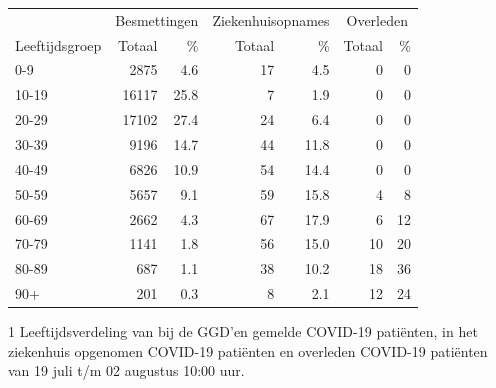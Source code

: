 \documentclass[
  english,
  man,floatsintext]{apa6}
\begin{document}
\begin{table}
\centering\begingroup\fontsize{11}{13}\selectfont

\begin{threeparttable}
\begin{tabular}{lrrrrrr}
\toprule
\multicolumn{1}{c}{ } & \multicolumn{2}{c}{Besmettingen} & \multicolumn{2}{c}{Ziekenhuisopnames} & \multicolumn{2}{c}{Overleden} \\
\cmidrule(l{3pt}r{3pt}){2-3} \cmidrule(l{3pt}r{3pt}){4-5} \cmidrule(l{3pt}r{3pt}){6-7}
Leeftijdsgroep & Totaal & \% & Totaal & \% & Totaal & \%\\
\midrule
0-9 & 2875 & 4.6 & 17 & 4.5 & 0 & 0\\
10-19 & 16117 & 25.8 & 7 & 1.9 & 0 & 0\\
20-29 & 17102 & 27.4 & 24 & 6.4 & 0 & 0\\
30-39 & 9196 & 14.7 & 44 & 11.8 & 0 & 0\\
40-49 & 6826 & 10.9 & 54 & 14.4 & 0 & 0\\
50-59 & 5657 & 9.1 & 59 & 15.8 & 4 & 8\\
60-69 & 2662 & 4.3 & 67 & 17.9 & 6 & 12\\
70-79 & 1141 & 1.8 & 56 & 15.0 & 10 & 20\\
80-89 & 687 & 1.1 & 38 & 10.2 & 18 & 36\\
90+ & 201 & 0.3 & 8 & 2.1 & 12 & 24\\
\bottomrule
\end{tabular}
\begin{tablenotes}
\item[1] Leeftijdsverdeling van bij de GGD’en gemelde COVID-19 patiënten, in het ziekenhuis opgenomen COVID-19 patiënten en overleden COVID-19 patiënten van 19 juli t/m 02 augustus 10:00 uur.
\end{tablenotes}
\end{threeparttable}
\endgroup{}
\end{table}

\newpage
\end{document}
